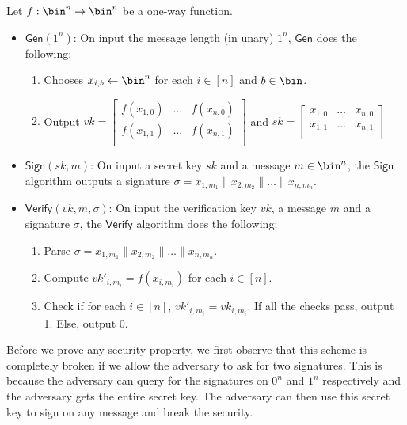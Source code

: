 \documentclass[12pt]{tufte-book}
\newcommand{\Gen}{\mathsf{Gen}}
\newcommand{\Sign}{\mathsf{Sign}}
\newcommand{\Verify}{\mathsf{Verify}}
\begin{document}
Let $f: \bin^n \rightarrow \bin^n$ be a one-way function.
\begin{itemize}
\item $\Gen(1^n)$: On input the message length (in unary) $1^n$, $\Gen$ does the following:
\begin{enumerate}
    \item Chooses $x_{i,b} \gets \bin^n$ for each $i \in [n]$ and $b \in \bin$.
    \item Output $vk = \left[ \begin{array}{ccc}
f(x_{1,0}) & \ldots & f(x_{n,0}) \\
f(x_{1,1}) & \ldots & f(x_{n,1}) \\
\end{array} \right]$ and $sk = \left[ \begin{array}{ccc}
x_{1,0} & \ldots & x_{n,0} \\
x_{1,1} & \ldots & x_{n,1} \\
\end{array} \right]$
\end{enumerate}
\item $\Sign(sk, m)$: On input a secret key $sk$ and a message $m \in \bin^n$, the $\Sign$ algorithm outputs a signature $\sigma = x_{1,m_1}\|x_{2,m_2}\| \ldots \| x_{n,m_n}$.
\item $\Verify(vk, m, \sigma)$: On input the verification key $vk$, a message $m$ and a signature $\sigma$, the $\Verify$ algorithm does the following:
\begin{enumerate}
    \item Parse $\sigma = x_{1,m_1}\|x_{2,m_2}\| \ldots \| x_{n,m_n}$.
    \item Compute $vk'_{i,m_i} = f(x_{i,m_i})$ for each $i \in [n]$.
    \item Check if for each $i \in [n]$, $vk'_{i,m_i} = vk_{i,m_i}$. If all the checks pass, output 1. Else, output 0.
\end{enumerate}
\end{itemize}

Before we prove any security property, we first observe that this scheme is completely broken if we allow the adversary to ask for two signatures. This is because the adversary can query for the signatures on $0^n$ and $1^n$ respectively and the adversary gets the entire secret key. The adversary can then use this secret key to sign on any message and break the security. 
\end{document}
